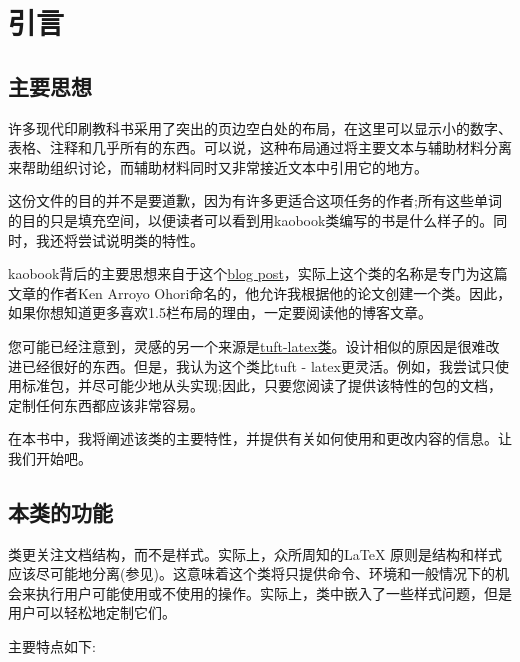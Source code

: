 \setchapterpreamble[u]{\margintoc}
\chapter{引言}

\section{主要思想}

许多现代印刷教科书采用了突出的页边空白处的布局，在这里可以显示小的数字、表格、注释和几乎所有的东西。可以说，这种布局通过将主要文本与辅助材料分离来帮助组织讨论，而辅助材料同时又非常接近文本中引用它的地方。

这份文件的目的并不是要道歉，因为有许多更适合这项任务的作者;所有这些单词的目的只是填充空间，以便读者可以看到用kaobook类编写的书是什么样子的。同时，我还将尝试说明类的特性。

kaobook背后的主要思想来自于这个\href{https://3d.bk.tudelft.nl/ken/en/2016/04/17/a-1.5-column-layout-in latex。html}{blog post}，实际上这个类的名称是专门为这篇文章的作者Ken Arroyo Ohori命名的，他允许我根据他的论文创建一个类。因此，如果你想知道更多喜欢1.5栏布局的理由，一定要阅读他的博客文章。

您可能已经注意到，灵感的另一个来源是\href{https://github.com/tuft-latex/tuft-latex}{tuft-latex类}。设计相似的原因是很难改进已经很好的东西。但是，我认为这个类比tuft - latex更灵活。例如，我尝试只使用标准包，并尽可能少地从头实现;因此，只要您阅读了提供该特性的包的文档，定制任何东西都应该非常容易。

在本书中，我将阐述该类的主要特性，并提供有关如何使用和更改内容的信息。让我们开始吧。

\section{本类的功能}

类更关注文档结构，而不是样式。实际上，众所周知的\LaTeX\xspace 原则是结构和样式应该尽可能地分离(参见)。这意味着这个类将只提供命令、环境和一般情况下的机会来执行用户可能使用或不使用的操作。实际上，类中嵌入了一些样式问题，但是用户可以轻松地定制它们。

主要特点如下:

